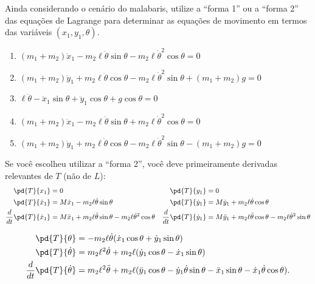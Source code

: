 \begin{question}
  	Ainda considerando o cenário do malabaris, utilize a ``forma 1'' ou a ``forma 2'' das equações de Lagrange para determinar as equações de movimento em termos das variáveis $(x_1, y_1, \theta)$.

  	\begin{enumerate}
  		\item $(m_1 + m_2) \ddot x_1 - m_2 \ell \ddot\theta \sin\theta - m_2 \ell \dot\theta^2 \cos\theta = 0$ \rightanswer
  		\item $(m_1 + m_2) \ddot y_1 + m_2 \ell \ddot\theta \cos\theta - m_2 \ell \dot\theta^2 \sin\theta + (m_1 + m_2)g = 0$ \rightanswer
  		\item $\ell \ddot\theta - \ddot x_1 \sin\theta + \ddot y_1 \cos\theta + g \cos\theta = 0$ \rightanswer
  		\item $(m_1 + m_2) \ddot x_1 - m_2 \ell \ddot\theta \sin\theta + m_2 \ell \dot\theta^2 \cos\theta = 0$
  		\item $(m_1 + m_2) \ddot y_1 + m_2 \ell \ddot\theta \cos\theta - m_2 \ell \dot\theta^2 \sin\theta - (m_1 + m_2)g = 0$
  	\end{enumerate}

    \begin{solution}
      Se você escolheu utilizar a ``forma 2'', você deve primeiramente derivadas relevantes de $T$ (não de $L$):
      \begin{align*}
        \pd{T}{x_1} &= 0
          & \pd{T}{y_1} &= 0 \\
        \pd{T}{\dot x_1} &= M\dot x_1 - m_2 \ell \dot\theta \sin\theta
          & \pd{T}{\dot y_1} &= M\dot y_1 + m_2\ell\dot\theta \cos\theta \\
        \frac{d}{dt}\pd{T}{\dot x_1} &= M\ddot x_1 + m_2\ell\ddot\theta\sin\theta - m_2\ell\dot\theta^2\cos\theta
          & \frac{d}{dt}\pd{T}{\dot y_1} &= M\ddot y_1 + m_2\ell\ddot\theta\cos\theta - m_2\ell\dot\theta^2\sin\theta
      \end{align*}

      \begin{align*}
        \pd{T}{\theta} &= -m_2\ell \dot\theta (\dot x_1 \cos\theta + \dot y_1 \sin\theta)\\
        \pd{T}{\dot \theta} &= m_2\ell^2 \dot\theta + m_2\ell (\dot y_1 \cos\theta - \dot x_1 \sin\theta) \\
        \frac{d}{dt}\pd{T}{\dot \theta} &= m_2\ell^2\ddot\theta + m_2\ell(\ddot y_1 \cos\theta - \dot y_1\dot \theta \sin\theta - \ddot x_1\sin\theta - \dot x_1\dot \theta \cos\theta).
      \end{align*}


\end{solution}
\end{question}
